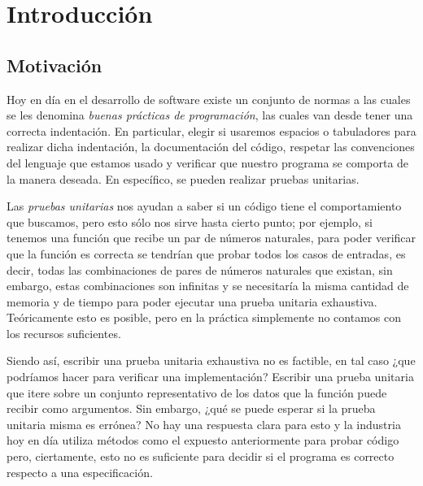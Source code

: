 \chapter{Introducción}

\section{Motivación}
\label{motivation}
Hoy en día en el desarrollo de software existe un conjunto de normas a las cuales se les 
denomina \textit{buenas pr\'acticas de programaci\'on}, las cuales van desde tener una correcta
indentaci\'on. En particular, elegir si usaremos espacios o tabuladores para realizar dicha 
indentaci\'on, la documentaci\'on del c\'odigo, respetar las convenciones del lenguaje que estamos 
usado y verificar que nuestro programa se comporta de la manera deseada. En espec\'ifico, se pueden 
realizar pruebas unitarias.

Las \textit{pruebas unitarias} nos ayudan a saber si un código tiene el comportamiento
que buscamos, pero esto s\'olo nos sirve hasta cierto punto; por ejemplo, si tenemos una funci\'on
que recibe un par de números naturales, para poder verificar que la funci\'on es correcta se 
tendrían que probar todos los casos de entradas, es decir, todas las combinaciones de pares de 
números naturales que existan, sin embargo, estas combinaciones son infinitas y se necesitaría la 
misma cantidad de memoria y de tiempo para poder ejecutar una prueba unitaria exhaustiva. 
Teóricamente esto es posible, pero en la pr\'actica simplemente no contamos con los recursos 
suficientes.

Siendo as\'i, escribir una prueba unitaria exhaustiva no es factible, en tal caso ¿que podríamos
hacer para verificar una implementaci\'on? Escribir una prueba unitaria que itere sobre un conjunto
representativo de los datos que la funci\'on puede recibir como argumentos. Sin embargo, ¿qu\'e se 
puede esperar si la prueba unitaria misma es errónea? No hay una respuesta clara para esto y la 
industria hoy en día utiliza métodos como el expuesto anteriormente para probar c\'odigo pero, 
ciertamente, esto no es suficiente para decidir si el programa es correcto respecto a una 
especificaci\'on.

